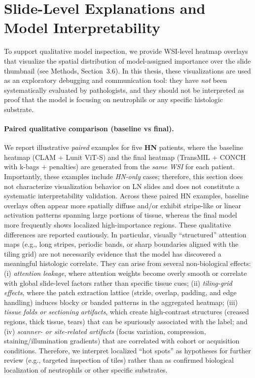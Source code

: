 \section{Slide-Level Explanations and Model Interpretability}
\label{sec:heatmaps}

To support qualitative model inspection, we provide WSI-level heatmap overlays that visualize the spatial distribution of model-assigned importance over the slide thumbnail (see Methods, Section~3.6). In this thesis, these visualizations are used as an exploratory debugging and communication tool: they have \emph{not} been systematically evaluated by pathologists, and they should not be interpreted as proof that the model is focusing on neutrophils or any specific histologic substrate.

\paragraph{Paired qualitative comparison (baseline vs final).}
We report illustrative \emph{paired} examples for five \textbf{HN} patients, where the baseline heatmap (CLAM + Lunit ViT-S) and the final heatmap (TransMIL + CONCH with k-bags + penalties) are generated from the \emph{same WSI} for each patient. Importantly, these examples include \emph{HN-only} cases; therefore, this section does not characterize visualization behavior on LN slides and does not constitute a systematic interpretability validation. Across these paired HN examples, baseline overlays often appear more spatially diffuse and/or exhibit stripe-like or linear activation patterns spanning large portions of tissue, whereas the final model more frequently shows localized high-importance regions.
These qualitative differences are reported cautiously. In particular, visually ``structured'' attention maps (e.g., long stripes, periodic bands, or sharp boundaries aligned with the tiling grid) are not necessarily evidence that the model has discovered a meaningful histologic correlate. They can arise from several non-biological effects: (i) \emph{attention leakage}, where attention weights become overly smooth or correlate with global slide-level factors rather than specific tissue cues; (ii) \emph{tiling-grid effects}, where the patch extraction lattice (stride, overlap, padding, and edge handling) induces blocky or banded patterns in the aggregated heatmap; (iii) \emph{tissue folds or sectioning artifacts}, which create high-contrast structures (creased regions, thick tissue, tears) that can be spuriously associated with the label; and (iv) \emph{scanner- or site-related artifacts} (focus variation, compression, staining/illumination gradients) that are correlated with cohort or acquisition conditions. Therefore, we interpret localized ``hot spots'' as hypotheses for further review (e.g., targeted inspection of tiles) rather than as confirmed biological localization of neutrophils or other specific substrates.

